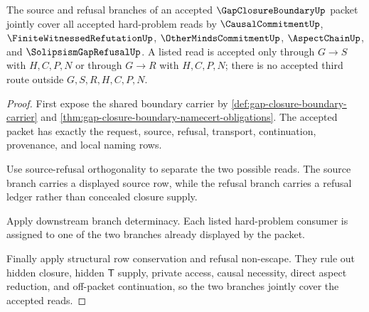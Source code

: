 \begin{theorem}
\label{thm:gap-closure-boundary-refusal-source-coverage}
The source and refusal branches of an accepted $\GapClosureBoundaryUp$ packet jointly cover all accepted hard-problem reads by $\CausalCommitmentUp$, $\FiniteWitnessedRefutationUp$, $\OtherMindsCommitmentUp$, $\AspectChainUp$, and $\SolipsismGapRefusalUp$. A listed read is accepted only through $G \longrightarrow S$ with $H,C,P,N$ or through $G \longrightarrow R$ with $H,C,P,N$; there is no accepted third route outside $G,S,R,H,C,P,N$.
\end{theorem}
\begin{proof}
First expose the shared boundary carrier by \autoref{def:gap-closure-boundary-carrier} and \autoref{thm:gap-closure-boundary-namecert-obligations}. The accepted packet has exactly the request, source, refusal, transport, continuation, provenance, and local naming rows.

Use source-refusal orthogonality to separate the two possible reads. The source branch carries a displayed source row, while the refusal branch carries a refusal ledger rather than concealed closure supply.

Apply downstream branch determinacy. Each listed hard-problem consumer is assigned to one of the two branches already displayed by the packet.

Finally apply structural row conservation and refusal non-escape. They rule out hidden closure, hidden $\mathsf{T}$ supply, private access, causal necessity, direct aspect reduction, and off-packet continuation, so the two branches jointly cover the accepted reads.
\end{proof}

